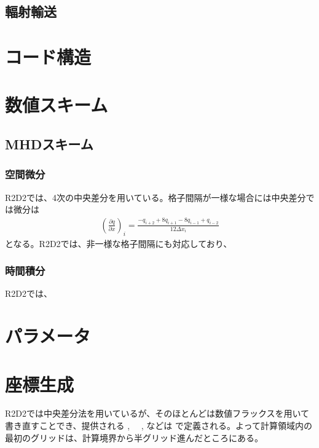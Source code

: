 \documentclass[letterpaper,10pt,dvipdfmx,report]{sphinxmanual}
\begin{document}
\section{輻射輸送}
\label{\detokenize{equation:id3}}

\chapter{コード構造}
\label{\detokenize{code:id1}}\label{\detokenize{code::doc}}

\chapter{数値スキーム}
\label{\detokenize{scheme:id1}}\label{\detokenize{scheme::doc}}

\section{MHDスキーム}
\label{\detokenize{scheme:mhd}}

\subsection{空間微分}
\label{\detokenize{scheme:id2}}
R2D2では、4次の中央差分を用いている。格子間隔が一様な場合には中央差分では微分は
\begin{equation*}
\begin{split}\left(\frac{\partial q}{\partial x}\right)_i =\frac{-q_{i+2}+8q_{i+1}-8q_{i-1}+q_{i-2}}{12\Delta x_i}\end{split}
\end{equation*}
となる。R2D2では、非一様な格子間隔にも対応しており、


\subsection{時間積分}
\label{\detokenize{scheme:id3}}
R2D2では、


\chapter{パラメータ}
\label{\detokenize{parameter:id1}}\label{\detokenize{parameter::doc}}

\chapter{座標生成}
\label{\detokenize{geometry:id1}}\label{\detokenize{geometry::doc}}
R2D2では中央差分法を用いているが、そのほとんどは数値フラックスを用いて書き直すことでき、提供される  , 　,  などは  で定義される。よって計算領域内の最初のグリッドは、計算境界から半グリッド進んだところにある。
\end{document}
